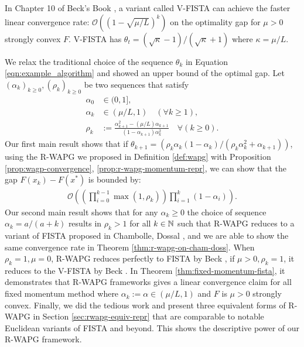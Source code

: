 \documentclass[12pt]{article}
\begin{document}
        In Chapter 10 of Beck's Book \cite{beck_first-order_2017}, a variant called V-FISTA can achieve the faster linear convergence rate: $\mathcal O((1 - \sqrt{\mu/L})^k)$ on the optimality gap for $\mu > 0$ strongly convex $F$. 
        V-FISTA has $\theta_t = (\sqrt{\kappa} - 1)/(\sqrt{\kappa} + 1)$ where $\kappa = \mu/L$. 
        \par
        We relax the traditional choice of the sequence $\theta_k$ in Equation \ref{eqn:example_algorithm} and showed an upper bound of the optimal gap. 
        Let $(\alpha_k)_{k \ge0}, (\rho_k)_{k \ge 0}$ be two sequences that satisfy
        \begin{align*}
            \alpha_0 &\in (0, 1], 
            \\
            \alpha_k &\in (\mu/L, 1) \quad (\forall k \ge 1), 
            \\
            \rho_k &:= \frac{\alpha_{k + 1}^2 - (\mu/L)\alpha_{k + 1}}{(1 - \alpha_{k + 1})\alpha_k^2} \quad \forall (k \ge 0). 
        \end{align*}
        Our first main result shows that if $\theta_{k + 1} = (\rho_k\alpha_k(1 - \alpha_k)/(\rho_k\alpha_k^2 + \alpha_{k + 1}))$, using the R-WAPG we proposed in Definition \ref{def:wapg} with Proposition \ref{prop:wagp-convergence}, \ref{prop:r-wapg-momentum-repr}, we can show that the gap $F(x_k) - F(x^*)$ is bounded by:
        \begin{align*}
            \mathcal O\left(
                \left(
                    \prod_{i = 0}^{k - 1} \max(1, \rho_{k})
                \right)
                \prod_{i = 1}^{k} \left(1  - \alpha_i\right)
            \right). 
        \end{align*}
        Our second main result shows that for any $\alpha_k \ge 0$ the choice of sequence $\alpha_k = a/(a + k)$ results in $\rho_k > 1$ for all $k \in \mathbb N$ such that R-WAPG reduces to a variant of FISTA proposed in Chambolle, Dossal \cite{chambolle_convergence_2015}, and we are able to show the same convergence rate in Theorem \ref{thm:r-wapg-on-cham-doss}. 
        When $\rho_k = 1, \mu = 0$, R-WAPG reduces perfectly to FISTA by Beck \cite{beck_first-order_2017}, if $\mu > 0, \rho_k = 1$, it reduces to the V-FISTA by Beck \cite{beck_first-order_2017}. 
        In Theorem \ref{thm:fixed-momentum-fista}, it demonstrates that R-WAPG frameworks gives a linear convergence claim for all fixed momentum method where $\alpha_k := \alpha \in (\mu/L, 1)$ and  $F$ is $\mu > 0$ strongly convex. 
        Finally, we did the tedious work and present three equivalent forms of R-WAPG in Section \ref{sec:rwapg-equiv-repr} that are comparable to notable Euclidean variants of FISTA and beyond. This shows the descriptive power of our R-WAPG framework. 
\end{document}

